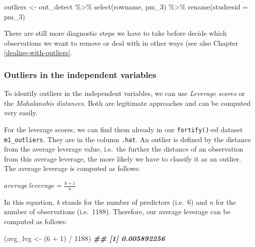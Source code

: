 \documentclass[
]{book}
\newenvironment{Shaded}{\begin{snugshade}}{\end{snugshade}}
\newcommand{\AttributeTok}[1]{\textcolor[rgb]{0.77,0.63,0.00}{#1}}
\newcommand{\DecValTok}[1]{\textcolor[rgb]{0.00,0.00,0.81}{#1}}
\newcommand{\DocumentationTok}[1]{\textcolor[rgb]{0.56,0.35,0.01}{\textbf{\textit{#1}}}}
\newcommand{\FunctionTok}[1]{\textcolor[rgb]{0.00,0.00,0.00}{#1}}
\newcommand{\NormalTok}[1]{#1}
\newcommand{\OtherTok}[1]{\textcolor[rgb]{0.56,0.35,0.01}{#1}}
\newcommand{\SpecialCharTok}[1]{\textcolor[rgb]{0.00,0.00,0.00}{#1}}
\begin{document}
\begin{Shaded}
\begin{Highlighting}[]
\NormalTok{outliers }\OtherTok{\textless{}{-}}\NormalTok{ out\_detect }\SpecialCharTok{\%\textgreater{}\%}
  \FunctionTok{select}\NormalTok{(rowname, pm\_3) }\SpecialCharTok{\%\textgreater{}\%}
  \FunctionTok{rename}\NormalTok{(}\AttributeTok{studresid =}\NormalTok{ pm\_3)}
\end{Highlighting}
\end{Shaded}

There are still more diagnostic steps we have to take before decide which observations we want to remove or deal with in other ways (see also Chapter \ref{dealing-with-outliers}.

\hypertarget{outliers-in-the-independent-variables}{%
\subsubsection{Outliers in the independent variables}\label{outliers-in-the-independent-variables}}

To identify outliers in the independent variables, we can use \emph{Leverage scores} or the \emph{Mahalanobis distances}. Both are legitimate approaches and can be computed very easily.

For the leverage scores, we can find them already in our \texttt{fortify()}-ed dataset \texttt{m1\_outliers}. They are in the column \texttt{.hat}. An outlier is defined by the distance from the average leverage value, i.e.~the further the distance of an observation from this average leverage, the more likely we have to classify it as an outlier. The average leverage is computed as follows:

\leavevmode\hypertarget{average-leverage-equation}{}%
\(average\ leverage = \frac{k + 1}{n}\)

In this equation, \emph{k} stands for the number of predictors (i.e.~6) and \emph{n} for the number of observations (i.e.~1188). Therefore, our average leverage can be computed as follows:

\begin{Shaded}
\begin{Highlighting}[]
\NormalTok{(avg\_lvg }\OtherTok{\textless{}{-}}\NormalTok{ (}\DecValTok{6} \SpecialCharTok{+} \DecValTok{1}\NormalTok{) }\SpecialCharTok{/} \DecValTok{1188}\NormalTok{)}
\DocumentationTok{\#\# [1] 0.005892256}
\end{Highlighting}
\end{Shaded}
\end{document}
